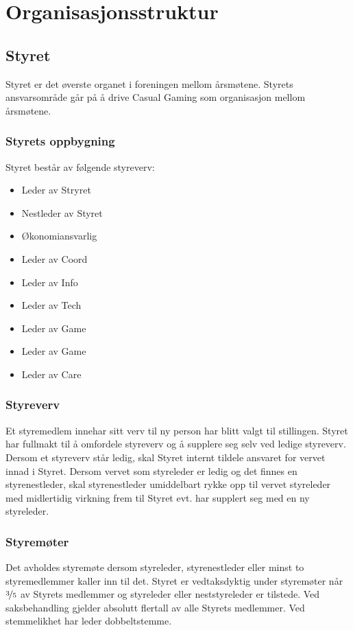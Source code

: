 \chapter{Organisasjonsstruktur}

\section{Styret}
Styret er det øverste organet i foreningen mellom årsmøtene. Styrets ansvarsområde går på å drive Casual Gaming som organisasjon mellom årsmøtene.

\subsection{Styrets oppbygning}
Styret består av følgende styreverv:
\begin{itemize}
    \item Leder av Stryret
    \item Nestleder av Styret
    \item Økonomiansvarlig
    \item Leder av Coord
    \item Leder av Info
    \item Leder av Tech
    \item Leder av Game
    \item Leder av Game
    \item Leder av Care
\end{itemize}

\subsection{Styreverv}
Et styremedlem innehar sitt verv til ny person har blitt valgt til stillingen. Styret har fullmakt til å omfordele styreverv og å supplere seg selv ved ledige styreverv. Dersom et styreverv står ledig, skal Styret internt tildele ansvaret for vervet innad i Styret. Dersom vervet som styreleder er ledig og det finnes en styrenestleder, skal styrenestleder umiddelbart rykke opp til vervet styreleder med midlertidig virkning frem til Styret evt. har supplert seg med en ny styreleder.

\subsection{Styremøter}
Det avholdes styremøte dersom styreleder, styrenestleder eller minst to styremedlemmer kaller inn til det. Styret er vedtaksdyktig under styremøter når $\nicefrac{3}{5}$ av Styrets medlemmer og styreleder eller neststyreleder er tilstede. Ved saksbehandling gjelder absolutt flertall av alle Styrets medlemmer. Ved stemmelikhet har leder dobbeltstemme.

